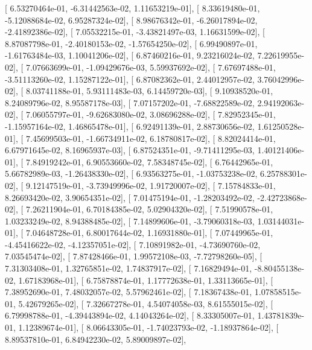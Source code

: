 \documentclass{article}
\begin{document}
       [  6.53270464e-01,  -6.31442563e-02,   1.11653219e-01],
       [  8.33619480e-01,  -5.12088684e-02,   6.95287324e-02],
       [  8.98676342e-01,  -6.26017894e-02,  -2.41892386e-02],
       [  7.05532215e-01,  -3.43821497e-03,   1.16631599e-02],
       [  8.87087798e-01,  -2.40180153e-02,  -1.57654250e-02],
       [  6.99490897e-01,  -1.61763484e-03,   1.10041206e-02],
       [  6.87460216e-01,   9.23216024e-02,   7.22619955e-02],
       [  7.07663699e-01,  -1.09429676e-03,   5.59937692e-02],
       [  7.67697488e-01,  -3.51113260e-02,   1.15287122e-01],
       [  6.87082362e-01,   2.44012957e-02,   3.76042996e-02],
       [  8.03741188e-01,   5.93111483e-03,   6.14459720e-03],
       [  9.10938520e-01,   8.24089796e-02,   8.95587178e-03],
       [  7.07157202e-01,  -7.68822589e-02,   2.94192063e-02],
       [  7.06055797e-01,  -9.62683080e-02,   3.08696288e-02],
       [  7.82952345e-01,  -1.15957164e-02,   1.46865478e-01],
       [  6.92491139e-01,   2.88730656e-02,   1.61250528e-01],
       [  7.45699503e-01,  -1.66734911e-02,   6.18780817e-02],
       [  8.82024414e-01,   6.67971645e-02,   8.16965937e-03],
       [  6.87524351e-01,  -9.71411295e-03,   1.40121406e-01],
       [  7.84919242e-01,   6.90553660e-02,   7.58348745e-02],
       [  6.76442965e-01,   5.66782989e-03,  -1.26438330e-02],
       [  6.93563275e-01,  -1.03753238e-02,   6.25788301e-02],
       [  9.12147519e-01,  -3.73949996e-02,   1.91720007e-02],
       [  7.15784833e-01,   8.26693420e-02,   3.90654351e-02],
       [  7.01475194e-01,  -1.28203492e-02,  -2.42723868e-02],
       [  7.26211904e-01,   6.70184385e-02,   5.02904320e-02],
       [  7.51990578e-01,   1.03233249e-02,   8.94388485e-02],
       [  7.14899606e-01,  -3.79060318e-03,   1.03144031e-01],
       [  7.04648728e-01,   6.80017644e-02,   1.16931880e-01],
       [  7.07449965e-01,  -4.45416622e-02,  -4.12357051e-02],
       [  7.10891982e-01,  -4.73690760e-02,   7.03545474e-02],
       [  7.87428466e-01,   1.99572108e-03,  -7.72798260e-05],
       [  7.31303408e-01,   1.32765851e-02,   1.74837917e-02],
       [  7.16829494e-01,  -8.80455138e-02,   1.67183968e-01],
       [  6.75878874e-01,   1.17772638e-01,   1.33113665e-01],
       [  7.38952690e-01,   7.48032057e-02,   5.57962461e-02],
       [  7.18367438e-01,   1.07858515e-01,   5.42679265e-02],
       [  7.32667278e-01,   4.54074058e-03,   8.61555015e-02],
       [  6.79998788e-01,  -4.39443894e-02,   4.14043264e-02],
       [  8.33305007e-01,   1.43781839e-01,   1.12389674e-01],
       [  8.06643305e-01,  -1.74023793e-02,  -1.18937864e-02],
       [  8.89537810e-01,   6.84942230e-02,   5.89009897e-02],
\end{document}
